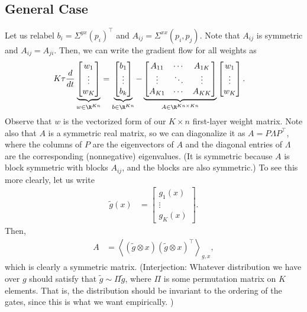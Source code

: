 \documentclass{article}
\begin{document}
\subsection{General Case}
Let us relabel %
$b_i = \Sigma^{yx}(p_i)^\top$ and $A_{ij} = \Sigma^{xx}(p_i,p_j)$.
Note that $A_{ij}$ is symmetric and $A_{ij} = A_{ji}$.
Then, we can write the gradient flow for all weights as
\begin{align}
  K \tau \frac{d}{dt} \underbrace{\begin{bmatrix} w_1 \\ \vdots \\ w_K \end{bmatrix}}_{w \in \R^{Kn}}
  &= \underbrace{\begin{bmatrix} b_1 \\ \vdots \\ b_k \end{bmatrix}}_{b \in \R^{Kn}} - \underbrace{\begin{bmatrix} A_{11} & \cdots & A_{1K} \\ \vdots & \ddots & \vdots \\ A_{K1} & \cdots & A_{KK} \end{bmatrix}}_{A \in \R^{Kn \times Kn}} \begin{bmatrix} w_1 \\ \vdots \\ w_K \end{bmatrix}. \label{eq:grad_flow_matrix}
\end{align}
Observe that $w$ is the vectorized form of our $K \times n$ first-layer weight matrix.
Note also that $A$ is a symmetric real matrix, so we can diagonalize it as $A = P \Lambda P^\top$, where the columns of $P$ are the eigenvectors of $A$ and the diagonal entries of $\Lambda$ are the corresponding (nonnegative) eigenvalues.
(It is symmetric because $A$ is block symmetric with blocks $A_{ij}$, and the blocks are also symmetric.)
To see this more clearly, let us write
\begin{align}
  \tilde{g}(x) &= \begin{bmatrix} g_1(x) \\ \vdots \\ g_K(x) \end{bmatrix}. %
\end{align}
Then,
\begin{align}
  A &= \left\langle (\tilde{g} \otimes x) (\tilde{g} \otimes x)^\top \right\rangle_{g,x}, \label{eq:A_kron}
\end{align}
which is clearly a symmetric matrix.
(Interjection: Whatever distribution we have over $g$ should satisfy that $\tilde{g} \sim \Pi \tilde{g}$, where $\Pi$ is some permutation matrix on $K$ elements.
That is, the distribution should be invariant to the ordering of the gates, since this is what we want empirically.
)
\end{document}
